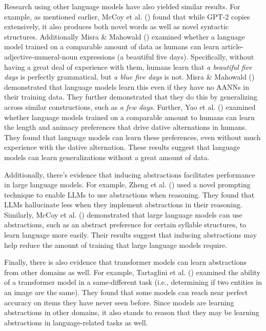 \documentclass[
  12pt,
  letterpaper,
]{scrreport}
\begin{document}
Research using other language models have also yielded similar results.
For example, as mentioned earlier, McCoy et al.
() found that while GPT-2
copies extensively, it also produces both novel words as well as novel
syntactic structures. Additionally Misra \& Mahowald
() examined whether a
language model trained on a comparable amount of data as humans can
learn article-adjective-numeral-noun expressions (a beautiful five
days). Specifically, without having a great deal of experience with
them, humans learn that \emph{a beautiful five days} is perfectly
grammatical, but \emph{a blue five days} is not. Misra \& Mahowald
() demonstrated that
language models learn this even if they have no AANNs in their training
data. They further demonstrated that they do this by generalizing across
similar constructions, such as \emph{a few days}. Further, Yao et al.
() examined whether
language models trained on a comparable amount to humans can learn the
length and animacy preferences that drive dative alternations in humans.
They found that language models can learn these preferences, even
without much experience with the dative alternation. These results
suggest that language models can learn generalizations without a great
amount of data.

Additionally, there's evidence that inducing abstractions facilitates
performance in large language models. For example, Zheng et al.
() used a novel prompting
technique to enable LLMs to use abstractions when reasoning. They found
that LLMs hallucinate less when they implement abstractions in their
reasoning. Similarly, McCoy et al.
()
demonstrated that large language models can use abstractions, such as an
abstract preference for certain syllable structures, to learn language
more easily. Their results suggest that inducing abstractions may help
reduce the amount of training that large language models require.

Finally, there is also evidence that transformer models can learn
abstractions from other domains as well. For example, Tartaglini et al.
() examined the
ability of a transformer model in a same-different task (i.e.,
determining if two entities in an image are the same). They found that
some models can reach near perfect accuracy on items they have never
seen before. Since models are learning abstractions in other domains, it
also stands to reason that they may be learning abstractions in
language-related tasks as well.
\end{document}
